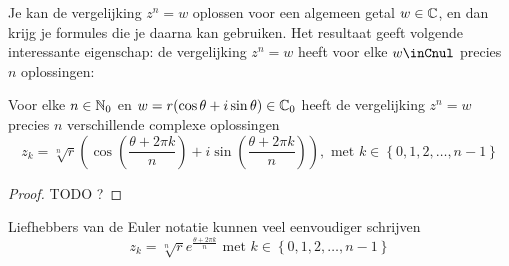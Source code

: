 \documentclass{ximera}
\begin{document}
Je kan de vergelijking $z^n=w$ oplossen voor een algemeen getal $w\in\mathbb{C}$, en dan krijg je formules die je daarna kan gebruiken. 
Het resultaat geeft volgende interessante eigenschap: de vergelijking $z^n=w$ heeft voor elke $w\inCnul$ precies $n$ oplossingen:

\begin{proposition}
    Voor elke $n\in\mathbb{N}_0$ en $w=r(\cos\theta+i\sin\theta) \in\mathbb{C}_0$ heeft de vergelijking $z^n = w$ precies $n$ verschillende complexe oplossingen
    $$
    z_k = \sqrt[n]{r}\left( \cos\left( \frac{\theta + 2\pi k}{n}\right) + i\sin\left( \frac{\theta + 2\pi k}{n}\right) \right), \text{ met } k\in\left\{0,1,2,\ldots,n-1\right\}
    $$
\end{proposition}
\begin{proof}
TODO ?
\end{proof}

Liefhebbers van de Euler notatie kunnen veel eenvoudiger schrijven
$$
    z_k = \sqrt[n]{r} e^\frac{\theta + 2\pi k}{n} \text{ met } k\in\left\{0,1,2,\ldots,n-1\right\}
$$
\end{document}
